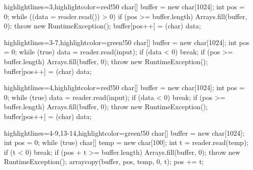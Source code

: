 \documentclass{article}
\begin{document}
\newpage
{}
\begin{snippet}
\begin{ffcode*}{highlightlines={3},highlightcolor=red!50}
char[] buffer = new char[1024];
int pos = 0;
while ((data = reader.read()) > 0) {
  if (pos >= buffer.length) {
    Arrays.fill(buffer, 0);
    throw new RuntimeException();
  }
  buffer[pos++] = (char) data;
}
\end{ffcode*}
\columnbreak
\begin{ffcode*}{highlightlines={3-7},highlightcolor=green!50}
char[] buffer = new char[1024];
int pos = 0;
while (true) {
  data = reader.read(input);
  if (data < 0) {
    break;
  }
  if (pos >= buffer.length) {
    Arrays.fill(buffer, 0);
    throw new RuntimeException();
  }
  buffer[pos++] = (char) data;
}
\end{ffcode*}
\end{snippet}

\newpage
{}
\begin{snippet}
\begin{ffcode*}{highlightlines={4},highlightcolor=red!50}
char[] buffer = new char[1024];
int pos = 0;
while (true) {
  data = reader.read(input);
  if (data < 0) {
    break;
  }
  if (pos >= buffer.length) {
    Arrays.fill(buffer, 0);
    throw new RuntimeException();
  }
  buffer[pos++] = (char) data;
}
\end{ffcode*}
\columnbreak
\begin{ffcode*}{highlightlines={4-9,13-14},highlightcolor=green!50}
char[] buffer = new char[1024];
int pos = 0;
while (true) {
  char[] temp = new char[100];
  int t = reader.read(temp);
  if (t < 0) {
    break;
  }
  if (pos + t >= buffer.length) {
    Arrays.fill(buffer, 0);
    throw new RuntimeException();
  }
  arraycopy(buffer, pos, temp, 0, t);
  pos += t;
}
\end{ffcode*}
\end{snippet}

\flush

\flush
\end{document}
